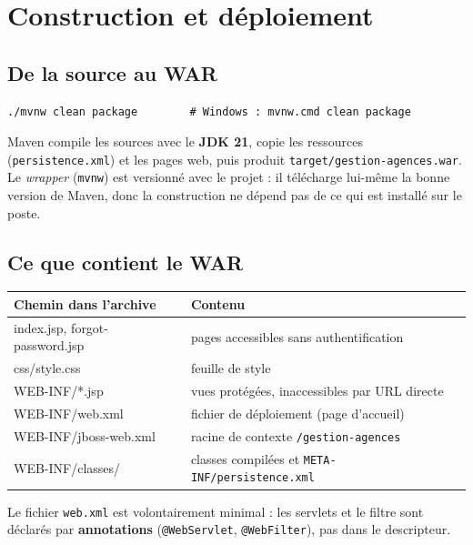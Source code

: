 \section{Construction et déploiement}

\subsection{De la source au WAR}

\begin{lstlisting}[style=shell]
./mvnw clean package        # Windows : mvnw.cmd clean package
\end{lstlisting}

Maven compile les sources avec le \textbf{JDK 21}, copie les ressources
(\texttt{persistence.xml}) et les pages web, puis produit
\texttt{target/gestion-agences.war}. Le \emph{wrapper} (\texttt{mvnw}) est
versionné avec le projet : il télécharge lui-même la bonne version de Maven,
donc la construction ne dépend pas de ce qui est installé sur le poste.

\subsection{Ce que contient le WAR}

\noindent\begin{tabularx}{\textwidth}{|>{\ttfamily}L{5.8cm}|X|}
\hline
\textmd{\textbf{Chemin dans l'archive}} & \textbf{Contenu}\\
\hline
index.jsp, forgot-password.jsp & pages accessibles sans authentification\\
\hline
css/style.css & feuille de style\\
\hline
WEB-INF/*.jsp & vues protégées, inaccessibles par URL directe\\
\hline
WEB-INF/web.xml & fichier de déploiement (page d'accueil)\\
\hline
WEB-INF/jboss-web.xml & racine de contexte \texttt{/gestion-agences}\\
\hline
WEB-INF/classes/ & classes compilées et \texttt{META-INF/persistence.xml}\\
\hline
\end{tabularx}

\vspace{0.5em}
Le fichier \texttt{web.xml} est volontairement minimal : les servlets et le
filtre sont déclarés par \textbf{annotations}
(\texttt{@WebServlet}, \texttt{@WebFilter}), pas dans le descripteur.

